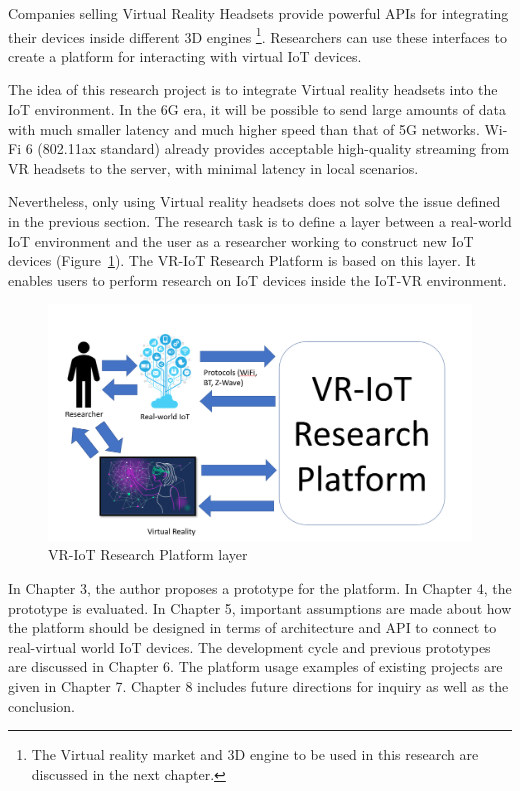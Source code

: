 Companies selling Virtual Reality Headsets provide powerful APIs for integrating their devices inside different 3D engines \footnote{The Virtual reality market and 3D engine to be used in this research are discussed in the next chapter.}. Researchers can use these interfaces to create a platform for interacting with virtual IoT devices.

The idea of this research project is to integrate Virtual reality headsets into the IoT environment. In the 6G era, it will be possible to send large amounts of data with much smaller latency and much higher speed than that of 5G networks. Wi-Fi 6 (802.11ax standard) already provides acceptable high-quality streaming from VR headsets to the server, with minimal latency in local scenarios.

Nevertheless, only using Virtual reality headsets does not solve the issue defined in the previous section. The research task is to define a layer between a real-world IoT environment and the user as a researcher working to construct new IoT devices (Figure~\ref{fig:VR-IoTResearchPlatformLayer-figure}). The VR-IoT Research Platform is based on this layer. It enables users to perform research on IoT devices inside the IoT-VR environment.

\begin{figure}
  \centering
  \includegraphics[width=0.9\linewidth]{figures/VR-IoTResearchPlatformLayer.png}
  \caption{VR-IoT Research Platform layer}
  \label{fig:VR-IoTResearchPlatformLayer-figure}
\end{figure}

In Chapter 3, the author proposes a prototype for the platform. In Chapter 4, the prototype is evaluated. In Chapter 5, important assumptions are made about how the platform should be designed in terms of architecture and API to connect to real-virtual world IoT devices. The development cycle and previous prototypes are discussed in Chapter 6. The platform usage examples of existing projects are given in Chapter 7. Chapter 8 includes future directions for inquiry as well as the conclusion.


